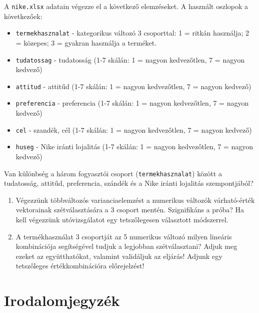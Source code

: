 \documentclass[
  letterpaper,
]{krantz}
\providecommand{\tightlist}{%
  \setlength{\itemsep}{0pt}\setlength{\parskip}{0pt}}\usepackage{longtable,booktabs,array}
\begin{document}
A \texttt{nike.xlsx} adatain végezze el a következő elemzéseket. A
használt oszlopok a következőek:

\begin{itemize}
\tightlist
\item
  \texttt{termekhasznalat} - kategorikus változó 3 csoporttal: 1 =
  ritkán használja; 2 = közepes; 3 = gyakran használja a terméket.
\item
  \texttt{tudatossag} - tudatosság (1-7 skálán: 1 = nagyon kedvezőtlen,
  7 = nagyon kedvező)
\item
  \texttt{attitud} - attitűd (1-7 skálán: 1 = nagyon kedvezőtlen, 7 =
  nagyon kedvező)
\item
  \texttt{preferencia} - preferencia (1-7 skálán: 1 = nagyon
  kedvezőtlen, 7 = nagyon kedvező)
\item
  \texttt{cel} - szandék, cél (1-7 skálán: 1 = nagyon kedvezőtlen, 7 =
  nagyon kedvező)
\item
  \texttt{huseg} - Nike iránti lojalitás (1-7 skálán: 1 = nagyon
  kedvezőtlen, 7 = nagyon kedvező)
\end{itemize}

Van különbség a három fogyasztói csoport (\texttt{termekhasznalat})
között a tudatosság, attitűd, preferencia, szándék és a Nike iránti
lojalitás szempontjából?

\begin{enumerate}
\def\labelenumi{\arabic{enumi}.}
\item
  Végezzünk többváltozós varianciaelemzést a numerikus változók
  várható-érték vektorainak szétválasztására a 3 csoport mentén.
  Szignifikáns a próba? Ha kell végezzünk utóvizsgálatot egy
  tetszőlegesen választott módszerrel.
\item
  A termékhasználat 3 csoportját az 5 numerikus változó milyen lineáris
  kombinációja segítségével tudjuk a legjobban szétválasztani? Adjuk meg
  ezeket az együtthatókat, valamint validáljuk az eljárás! Adjunk egy
  tetszőleges értékkombinációra előrejelzést!
\end{enumerate}

\hypertarget{irodalomjegyzuxe9k}{%
\chapter{Irodalomjegyzék}\label{irodalomjegyzuxe9k}}
\end{document}
